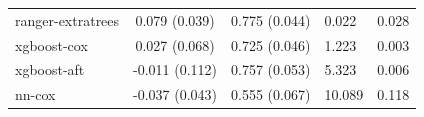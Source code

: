 \documentclass[twoside,11pt]{article}\usepackage[]{graphicx}\usepackage[]{xcolor}
\newenvironment{knitrout}{}{} %
\begin{document}
\begin{knitrout}
\begin{longtable}[t]{lcclc}
\hspace{1em}ranger-extratrees & 0.079 (0.039) & 0.775 (0.044) & 0.022 & 0.028\\
\hspace{1em}xgboost-cox & 0.027 (0.068) & 0.725 (0.046) & 1.223 & 0.003\\
\hspace{1em}xgboost-aft & -0.011 (0.112) & 0.757 (0.053) & 5.323 & 0.006\\
\hspace{1em}nn-cox & -0.037 (0.043) & 0.555 (0.067) & 10.089 & 0.118\\*
\end{longtable}

\end{knitrout}


\vskip 0.2in

\end{document}
